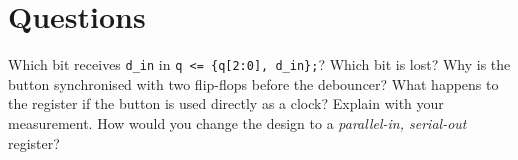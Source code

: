 \section{Questions}
\begin{questions}
  \question Which bit receives \texttt{d\_in} in \texttt{q <= \{q[2:0], d\_in\};}? Which bit is lost?
  \question Why is the button synchronised with two flip-flops before the debouncer?
  \question What happens to the register if the button is used directly as a clock? Explain with your measurement.
  \question How would you change the design to a \emph{parallel-in, serial-out} register?
\end{questions}
